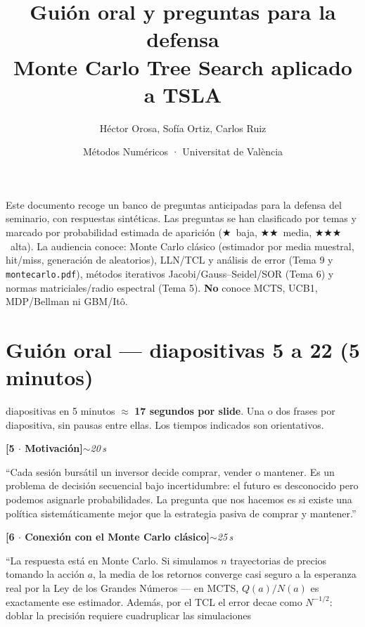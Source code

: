 \documentclass[11pt,a4paper]{article}
\title{\color{uvblue}\bfseries
  Guión oral y preguntas para la defensa\\[2pt]
  \large Monte Carlo Tree Search aplicado a TSLA}
\author{Héctor Orosa, Sofía Ortiz, Carlos Ruiz}
\date{Métodos Numéricos · Universitat de València}
\begin{document}
\maketitle

\noindent
Este documento recoge un banco de preguntas anticipadas para la defensa
del seminario, con respuestas sintéticas. Las preguntas se han clasificado
por temas y marcado por probabilidad estimada de aparición
($\bigstar$~baja, $\bigstar\bigstar$~media, $\bigstar\bigstar\bigstar$~alta).
La audiencia conoce: Monte Carlo clásico (estimador por media muestral, hit/miss,
generación de aleatorios), LLN/TCL y análisis de error (Tema 9 y
\texttt{montecarlo.pdf}), métodos iterativos Jacobi/Gauss--Seidel/SOR
(Tema 6) y normas matriciales/radio espectral (Tema 5). \textbf{No} conoce
MCTS, UCB1, MDP/Bellman ni GBM/Itô.

\tableofcontents
\bigskip

\section*{Guión oral — diapositivas 5 a 22 (5 minutos)}

 diapositivas en 5 minutos $\approx$ \textbf{17 segundos por slide}.
Una o dos frases por diapositiva, sin pausas entre ellas.
Los tiempos indicados son orientativos.

\newcommand{\slide}[4]{%
  \par\medskip\noindent
  \textbf{[#1 $\cdot$ #2]}\hfill\textit{$\sim$#3\,s}\par\smallskip
  \noindent #4\par}

\slide{5}{Motivación}{20}{%
``Cada sesión bursátil un inversor decide comprar, vender o mantener.
Es un problema de decisión secuencial bajo incertidumbre: el futuro es
desconocido pero podemos asignarle probabilidades.
La pregunta que nos hacemos es si existe una política
sistemáticamente mejor que la estrategia pasiva de comprar y mantener.''}

\slide{6}{Conexión con el Monte Carlo clásico}{25}{%
``La respuesta está en Monte Carlo. Si simulamos $n$ trayectorias de precios
tomando la acción $a$, la media de los retornos converge casi seguro a la
esperanza real por la Ley de los Grandes Números ---
en MCTS, $Q(a)/N(a)$ es exactamente ese estimador.
Además, por el TCL el error decae como $N^{-1/2}$: doblar la precisión
requiere cuadruplicar las simulaciones} %
\end{document}
